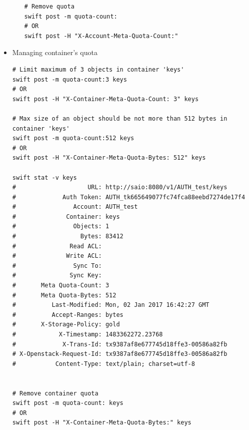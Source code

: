 \documentclass{article}
\begin{document}
\begin{itemize}
\begin{itemize}
\begin{verbatim}
# Remove quota
swift post -m quota-count:
# OR
swift post -H "X-Account-Meta-Quota-Count:"
\end{verbatim}
\end{itemize}

\item Managing container's quota

\begin{verbatim}
# Limit maximum of 3 objects in container 'keys'
swift post -m quota-count:3 keys
# OR
swift post -H "X-Container-Meta-Quota-Count: 3" keys

# Max size of an object should be not more than 512 bytes in container 'keys'
swift post -m quota-count:512 keys
# OR
swift post -H "X-Container-Meta-Quota-Bytes: 512" keys

swift stat -v keys
#                    URL: http://saio:8080/v1/AUTH_test/keys
#             Auth Token: AUTH_tk665649077fc74fca88eebd7274de17f4
#                Account: AUTH_test
#              Container: keys
#                Objects: 1
#                  Bytes: 83412
#               Read ACL:
#              Write ACL:
#                Sync To:
#               Sync Key:
#       Meta Quota-Count: 3
#       Meta Quota-Bytes: 512
#          Last-Modified: Mon, 02 Jan 2017 16:42:27 GMT
#          Accept-Ranges: bytes
#       X-Storage-Policy: gold
#            X-Timestamp: 1483362272.23768
#             X-Trans-Id: tx9387af8e677745d18ffe3-00586a82fb
# X-Openstack-Request-Id: tx9387af8e677745d18ffe3-00586a82fb
#           Content-Type: text/plain; charset=utf-8


# Remove container quota
swift post -m quota-count: keys
# OR
swift post -H "X-Container-Meta-Quota-Bytes:" keys
\end{verbatim}
\end{itemize}
\end{document}
